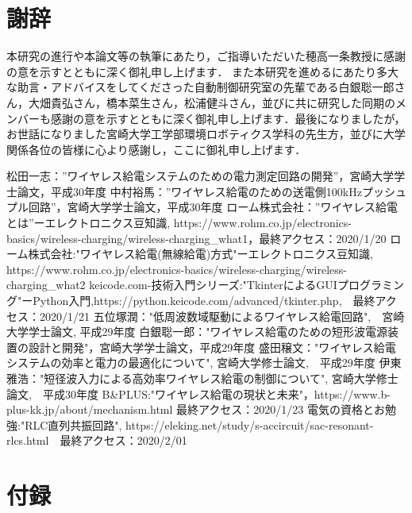 \documentclass[12pt]{jarticle}
\begin{document}
\section{謝辞}
 本研究の進行や本論文等の執筆にあたり，ご指導いただいた穂高一条教授に感謝の意を示すとともに深く御礼申し上げます．
また本研究を進めるにあたり多大な助言・アドバイスをしてくださった自動制御研究室の先輩である白銀聡一郎さん，大畑貴弘さん，橋本菜生さん，松浦健斗さん，並びに共に研究した同期のメンバーも感謝の意を示すとともに深く御礼申し上げます．最後になりましたが，お世話になりました宮崎大学工学部環境ロボティクス学科の先生方，並びに大学関係各位の皆様に心より感謝し，ここに御礼申し上げます．

\begin{thebibliography}{50}
	松田一志：”ワイヤレス給電システムのための電力測定回路の開発”，宮崎大学学士論文，平成30年度
	中村裕馬：”ワイヤレス給電のための送電側100kHzプッシュプル回路”，宮崎大学学士論文，平成30年度
	ローム株式会社：”ワイヤレス給電とは”ーエレクトロニクス豆知識, https://www.rohm.co.jp/electronics-basics/wireless-charging/wireless-charging\_what1，最終アクセス：2020/1/20
	ローム株式会社:"ワイヤレス給電(無線給電)方式"ーエレクトロニクス豆知識, https://www.rohm.co.jp/electronics-basics/wireless-charging/wireless-charging\_what2
	keicode.com-技術入門シリーズ:"TkinterによるGUIプログラミング"ーPython入門,https://python.keicode.com/advanced/tkinter.php,　最終アクセス：2020/1/21
	五位塚潤："低周波数域駆動によるワイヤレス給電回路",　宮崎大学学士論文, 平成29年度
	白銀聡一郎："ワイヤレス給電のための短形波電源装置の設計と開発"，宮崎大学学士論文，平成29年度
	盛田穣文："ワイヤレス給電システムの効率と電力の最適化について", 宮崎大学修士論文,　平成29年度
	伊東雅浩："短径波入力による高効率ワイヤレス給電の制御について", 宮崎大学修士論文,　平成30年度
	B\&PLUS:"ワイヤレス給電の現状と未来"，https://www.b-plus-kk.jp/about/mechanism.html 最終アクセス：2020/1/23
	電気の資格とお勉強:"RLC直列共振回路", https://eleking.net/study/s-accircuit/sac-resonant-rlcs.html　最終アクセス：2020/2/01
\end{thebibliography}
\clearpage
\section{付録}
\end{document}
